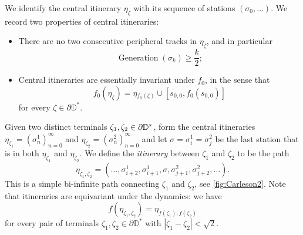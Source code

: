 

We identify the central itinerary $\eta_{\zeta}$ with its sequence of stations $(\sigma_0,\ldots)$. We record two properties of central itineraries:

\begin{itemize}
	\item There are no two consecutive peripheral tracks in $\eta_{\zeta}$, and in particular
	\begin{equation}
	\label{generation-lower-bound}
		\operatorname{Generation}(\sigma_k)\geq \frac k2;
	\end{equation}
	
	\item Central itineraries are essentially invariant under $f_{0}$, in the sense that
	\begin{equation*}
		f_{0}(\eta_{\zeta})=\eta{}_{f_{0}(\zeta)}\cup[s_{0,0},f_0(s_{0,0})]
	\end{equation*}
	for every $\zeta\in \partial \mathbb D^*$.
\end{itemize}

\begin{definition}
\label{def-disk-itinerary}
Given two distinct terminals $\zeta_{1},\zeta_{2}\in\partial\mathbb{D}^*$, form the central itineraries $\eta_{\zeta_{1}}=\left(\sigma_{n}^{1}\right)_{n=0}^{\infty}$ and $\eta_{\zeta_{2}}=\left(\sigma_{n}^{2}\right)_{n=0}^{\infty}$ and let  $\sigma=\sigma^1_i=\sigma^2_j$ be the last station that is in both $\eta_{\zeta_{1}}$ and $\eta_{\zeta_{2}}$.  
	 We define the \emph{itinerary} between  $\zeta_{1}$ and $\zeta_{2}$ to be the path 
$$
 \eta_{\zeta_{1},\zeta_{2}}=  \left(\dots,\sigma_{i+2}^{1},\sigma_{i+1}^{1},\sigma,\sigma_{j+1}^{2},\sigma_{j+2}^{2},\dots\right).
$$
	This is a simple bi-infinite path connecting $\zeta_{1}$ and $\zeta_{2}$, see \cref{fig:Carleson2}. Note that itineraries are equivariant under the dynamics: we have  \begin{equation}
		f(\eta_{\zeta_1,\zeta_2})=\eta_{f(\zeta_1),f(\zeta_2)}
	\end{equation} for every pair of terminals $\zeta_1,\zeta_2 \in \partial \mathbb D^*$ with $|\zeta_1-\zeta_2| < \sqrt{2}$.
\end{definition}



